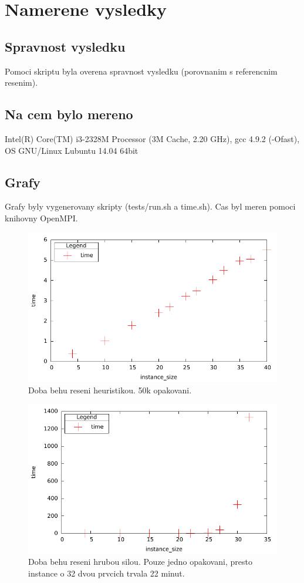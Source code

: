 \documentclass[12pt,a4paper]{article}
\begin{document}
\section{Namerene vysledky}

\subsection{Spravnost vysledku}
Pomoci skriptu byla overena spravnost vysledku (porovnanim s referencnim resenim).

\subsection{Na cem bylo mereno}
Intel(R) Core(TM) i3-2328M Processor (3M Cache, 2.20 GHz), gcc 4.9.2 (-Ofast), OS GNU/Linux Lubuntu 14.04 64bit

\subsection{Grafy}
Grafy byly vygenerovany skripty (tests/run.sh a time.sh). Cas byl meren pomoci knihovny OpenMPI.

\begin{figure}[H]
	\caption{Doba behu reseni heuristikou. 50k opakovani.}
	\includegraphics{./time_h.png}
\end{figure}

\begin{figure}[H]
	\caption{Doba behu reseni hrubou silou. Pouze jedno opakovani, presto instance o 32 dvou prvcich trvala 22 minut. }
	\includegraphics{./time_b.png}
\end{figure}
\end{document}
